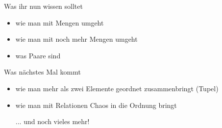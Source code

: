 \begin{frame}
	\begin{block}{Was ihr nun wissen solltet}
		\begin{itemize}
			\item wie man mit Mengen umgeht
			\item wie man mit noch mehr Mengen umgeht
			\item was Paare sind
		\end{itemize}
	\end{block}

	\begin{block}{Was nächstes Mal kommt}
		\begin{itemize}
			\item wie man mehr als zwei Elemente geordnet zusammenbringt (Tupel)
			\item wie man mit Relationen Chaos in die Ordnung bringt
			\item[ ...] und noch vieles mehr!
		\end{itemize}
	\end{block}
\end{frame}





